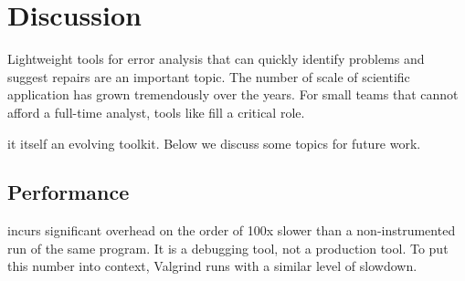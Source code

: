 \documentclass{juliacon}
\begin{document}





\section{Discussion}
\label{s:discussion}

Lightweight tools for error analysis that can quickly identify
\fp{} problems and suggest repairs are an important topic.
The number of scale of scientific application has grown tremendously
over the years.
For small teams that cannot afford a full-time
analyst, tools like \FlowFPX{} fill a critical role.

\FlowFPX{} it itself an evolving toolkit.
Below we discuss some topics for future work.


\subsection{Performance}
\label{s:discussion-performance}

\FT{} incurs significant overhead on the order of 100x slower than a non-instrumented run of the same program.
It is a debugging tool, not a production tool.
To put this number into context, Valgrind runs with a similar level of slowdown.
\end{document}
